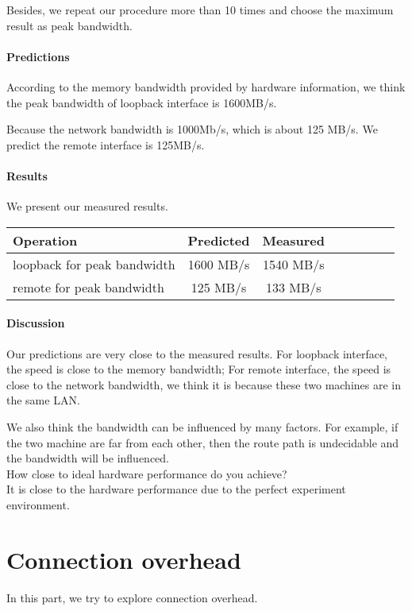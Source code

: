 Besides, we repeat our procedure more than 10 times and choose the maximum result as peak bandwidth.

\paragraph{Predictions}
According to the memory bandwidth provided by hardware information, we think the peak bandwidth of loopback interface is 1600MB/s. 

Because the network bandwidth is 1000Mb/s, which is about 125 MB/s. We predict the remote interface is 125MB/s.

\paragraph{Results}
We present our measured results.

\begin{center}
\begin{tabular}{l*{6}{c}r}
Operation       &  Predicted & Measured\\
\hline
loopback for peak bandwidth & 1600 MB/s & 1540 MB/s \\
remote for peak bandwidth & 125 MB/s  & 133 MB/s\\
\end{tabular}
\end{center}


\paragraph{Discussion}
Our predictions are very close to the measured results. For loopback interface, the speed is close to the memory bandwidth; For remote interface, the speed is close to the network bandwidth, we think it is because these two machines are in the same LAN.

We also think the bandwidth can be influenced by many factors. For example, if the two machine are far from each other, then the route path is undecidable and the bandwidth will be influenced. \\

How close to ideal hardware performance do you achieve? \\ 
It is close to the hardware performance due to the perfect experiment environment.

\section{Connection overhead}
In this part, we try to explore connection overhead.

